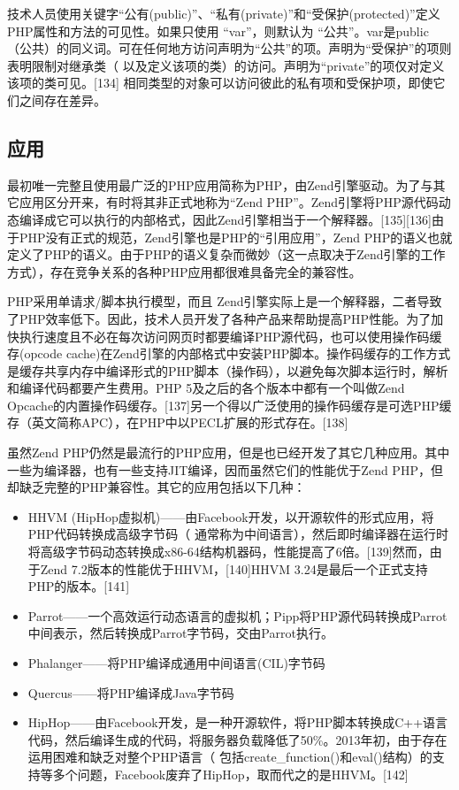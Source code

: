 技术人员使用关键字“公有(public)”、“私有(private)”和“受保护(protected)”定义PHP属性和方法的可见性。如果只使用 “var”，则默认为 “公共”。var是public（公共）的同义词。可在任何地方访问声明为“公共”的项。声明为“受保护”的项则表明限制对继承类（ 以及定义该项的类）的访问。声明为“private”的项仅对定义该项的类可见。[134] 相同类型的对象可以访问彼此的私有项和受保护项，即使它们之间存在差异。

\subsection{应用}
最初唯一完整且使用最广泛的PHP应用简称为PHP，由Zend引擎驱动。为了与其它应用区分开来，有时将其非正式地称为“Zend PHP”。Zend引擎将PHP源代码动态编译成它可以执行的内部格式，因此Zend引擎相当于一个解释器。[135][136]由于PHP没有正式的规范，Zend引擎也是PHP的“引用应用”，Zend PHP的语义也就定义了PHP的语义。由于PHP的语义复杂而微妙（这一点取决于Zend引擎的工作方式），存在竞争关系的各种PHP应用都很难具备完全的兼容性。

PHP采用单请求/脚本执行模型，而且 Zend引擎实际上是一个解释器，二者导致了PHP效率低下。因此，技术人员开发了各种产品来帮助提高PHP性能。为了加快执行速度且不必在每次访问网页时都要编译PHP源代码，也可以使用操作码缓存(opcode cache)在Zend引擎的内部格式中安装PHP脚本。操作码缓存的工作方式是缓存共享内存中编译形式的PHP脚本（操作码），以避免每次脚本运行时，解析和编译代码都要产生费用。PHP 5及之后的各个版本中都有一个叫做Zend Opcache的内置操作码缓存。[137]另一个得以广泛使用的操作码缓存是可选PHP缓存（英文简称APC），在PHP中以PECL扩展的形式存在。[138]

虽然Zend PHP仍然是最流行的PHP应用，但是也已经开发了其它几种应用。其中一些为编译器，也有一些支持JIT编译，因而虽然它们的性能优于Zend PHP，但却缺乏完整的PHP兼容性。其它的应用包括以下几种：
\begin{itemize}
\item HHVM (HipHop虚拟机)——由Facebook开发，以开源软件的形式应用，将PHP代码转换成高级字节码（ 通常称为中间语言），然后即时编译器在运行时将高级字节码动态转换成x86-64结构机器码，性能提高了6倍。[139]然而，由于Zend 7.2版本的性能优于HHVM，[140]HHVM 3.24是最后一个正式支持PHP的版本。[141]
\item Parrot——一个高效运行动态语言的虚拟机；Pipp将PHP源代码转换成Parrot中间表示，然后转换成Parrot字节码，交由Parrot执行。
\item Phalanger——将PHP编译成通用中间语言(CIL)字节码
\item Quercus——将PHP编译成Java字节码
\item HipHop——由Facebook开发，是一种开源软件，将PHP脚本转换成C++语言代码，然后编译生成的代码，将服务器负载降低了50\%。2013年初，由于存在运用困难和缺乏对整个PHP语言（ 包括create_function()和eval()结构）的支持等多个问题，Facebook废弃了HipHop，取而代之的是HHVM。[142]
\end{itemize}

